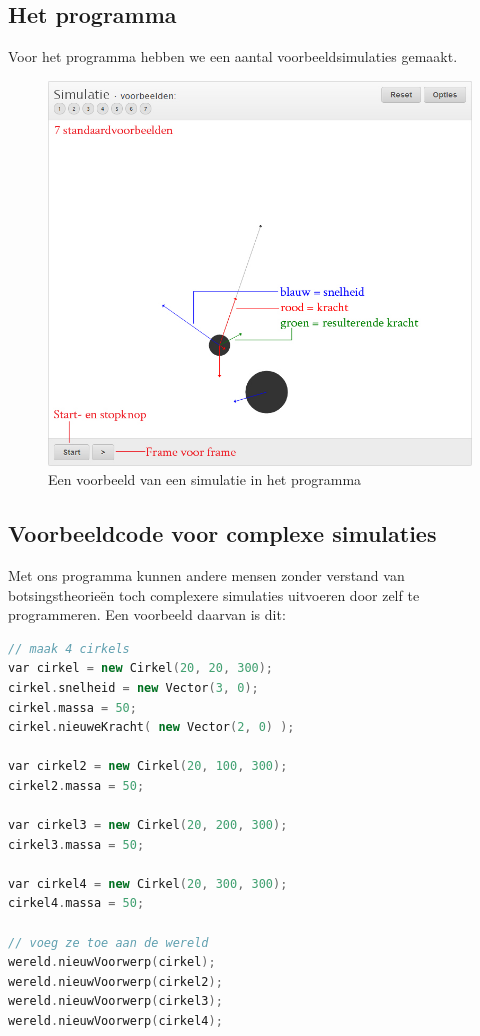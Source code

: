 \documentclass[12pt,a4paper]{article}
\begin{document}
	\subsection{Het programma}
	Voor het programma hebben we een aantal voorbeeldsimulaties gemaakt.
	\begin{figure}[h]
		\centerline{\includegraphics[width=\textwidth]{Plaatjes/programma-uitleg.jpg}}
		\caption{Een voorbeeld van een simulatie in het programma}
		\label{bal-bal}
	\end{figure}
	
	\subsection{Voorbeeldcode voor complexe simulaties}
	Met ons programma kunnen andere mensen zonder verstand van botsingstheorie\"{e}n toch complexere simulaties uitvoeren door zelf te programmeren. Een voorbeeld daarvan is dit:
	
	\begin{lstlisting}[language=C++]
// maak 4 cirkels
var cirkel = new Cirkel(20, 20, 300);
cirkel.snelheid = new Vector(3, 0);
cirkel.massa = 50;
cirkel.nieuweKracht( new Vector(2, 0) );

var cirkel2 = new Cirkel(20, 100, 300);
cirkel2.massa = 50;

var cirkel3 = new Cirkel(20, 200, 300);
cirkel3.massa = 50;

var cirkel4 = new Cirkel(20, 300, 300);
cirkel4.massa = 50;

// voeg ze toe aan de wereld
wereld.nieuwVoorwerp(cirkel);
wereld.nieuwVoorwerp(cirkel2);
wereld.nieuwVoorwerp(cirkel3);
wereld.nieuwVoorwerp(cirkel4);
	\end{lstlisting}
\end{document}
